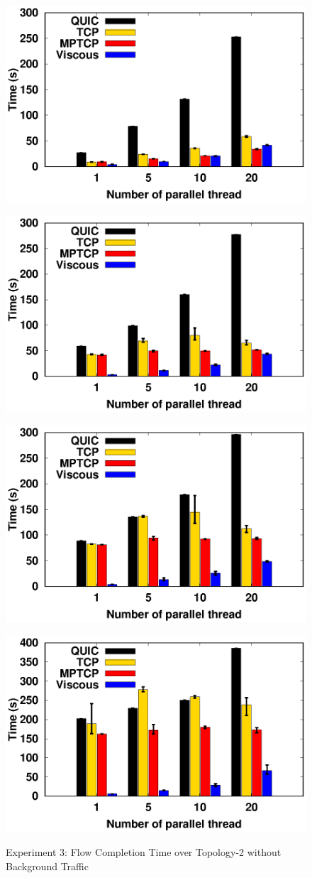 \begin{figure}[!t]
    \begin{center}
        \begin{minipage}{0.45\linewidth}
            \centering
            \includegraphics[width=0.24\linewidth]{img/exp10/time_elapsed_1}
            \label{fig:exp10_time_16}
        \end{minipage}
        \begin{minipage}{0.45\linewidth}
            \centering
            \includegraphics[width=0.24\linewidth]{img/exp10/time_elapsed_5}
            \label{fig:exp10_time_80}
        \end{minipage}
        \begin{minipage}{0.45\linewidth}
            \centering
            \includegraphics[width=0.24\linewidth]{img/exp10/time_elapsed_10}
            \label{fig:exp10_time_160}
        \end{minipage}
        \begin{minipage}{0.45\linewidth}
            \centering
            \includegraphics[width=0.24\linewidth]{img/exp10/time_elapsed_20}
            \label{fig:exp10_time_320}
        \end{minipage}
        \caption{\label{fig:exp10_time}Experiment 3: Flow Completion Time over Topology-2 without Background Traffic}
        \end{center}
    \end{figure}
    
